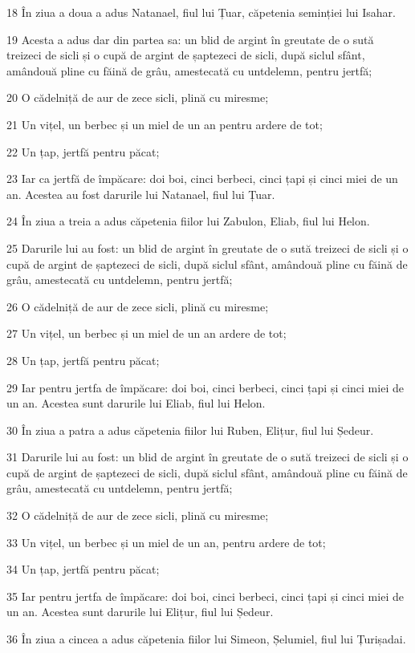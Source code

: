 \par 18 În ziua a doua a adus Natanael, fiul lui Țuar, căpetenia seminției lui Isahar.
\par 19 Acesta a adus dar din partea sa: un blid de argint în greutate de o sută treizeci de sicli și o cupă de argint de șaptezeci de sicli, după siclul sfânt, amândouă pline cu făină de grâu, amestecată cu untdelemn, pentru jertfă;
\par 20 O cădelniță de aur de zece sicli, plină cu miresme;
\par 21 Un vițel, un berbec și un miel de un an pentru ardere de tot;
\par 22 Un țap, jertfă pentru păcat;
\par 23 Iar ca jertfă de împăcare: doi boi, cinci berbeci, cinci țapi și cinci miei de un an. Acestea au fost darurile lui Natanael, fiul lui Țuar.
\par 24 În ziua a treia a adus căpetenia fiilor lui Zabulon, Eliab, fiul lui Helon.
\par 25 Darurile lui au fost: un blid de argint în greutate de o sută treizeci de sicli și o cupă de argint de șaptezeci de sicli, după siclul sfânt, amândouă pline cu făină de grâu, amestecată cu untdelemn, pentru jertfă;
\par 26 O cădelniță de aur de zece sicli, plină cu miresme;
\par 27 Un vițel, un berbec și un miel de un an ardere de tot;
\par 28 Un țap, jertfă pentru păcat;
\par 29 Iar pentru jertfa de împăcare: doi boi, cinci berbeci, cinci țapi și cinci miei de un an. Acestea sunt darurile lui Eliab, fiul lui Helon.
\par 30 În ziua a patra a adus căpetenia fiilor lui Ruben, Elițur, fiul lui Ședeur.
\par 31 Darurile lui au fost: un blid de argint în greutate de o sută treizeci de sicli și o cupă de argint de șaptezeci de sicli, după siclul sfânt, amândouă pline cu făină de grâu, amestecată cu untdelemn, pentru jertfă;
\par 32 O cădelniță de aur de zece sicli, plină cu miresme;
\par 33 Un vițel, un berbec și un miel de un an, pentru ardere de tot;
\par 34 Un țap, jertfă pentru păcat;
\par 35 Iar pentru jertfa de împăcare: doi boi, cinci berbeci, cinci țapi și cinci miei de un an. Acestea sunt darurile lui Elițur, fiul lui Ședeur.
\par 36 În ziua a cincea a adus căpetenia fiilor lui Simeon, Șelumiel, fiul lui Țurișadai.
